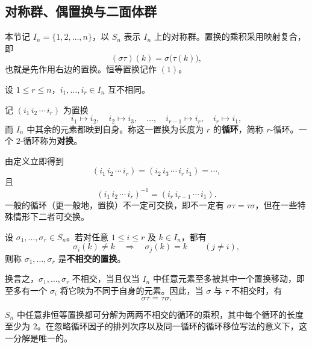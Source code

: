 \subsection{对称群、偶置换与二面体群}

本节记 $I_n=\{1,2,\ldots,n\}$，以 $S_n$ 表示 $I_n$ 上的对称群。置换的乘积采用映射复合，即
\[
  (\sigma\tau)(k)=\sigma\bigl(\tau(k)\bigr),
\]
也就是先作用右边的置换。恒等置换记作 $(1)$。

\begin{definition}[循环与对换]\label{def:cycles-transpositions}
设 $1\leq r\leq n$，$i_1,\ldots,i_r\in I_n$ 互不相同。

记 $(i_1\,i_2\,\cdots\,i_r)$ 为置换
\[
  i_1\longmapsto i_2,\quad i_2\longmapsto i_3,\quad\ldots,\quad
  i_{r-1}\longmapsto i_r,\quad i_r\longmapsto i_1,
\]
而 $I_n$ 中其余的元素都映到自身。称这一置换为长度为 $r$ 的\textbf{循环}，简称 $r$-循环。一个 $2$-循环称为\textbf{对换}。
\end{definition}

\begin{purplenote}
由定义立即得到
\[
  (i_1\,i_2\,\cdots\,i_r)
  =(i_2\,i_3\,\cdots\,i_r\,i_1)=\cdots,
\]
且
\[
  (i_1\,i_2\,\cdots\,i_r)^{-1}=(i_r\,i_{r-1}\,\cdots\,i_1).
\]
一般的循环（更一般地，置换）不一定可交换，即不一定有 $\sigma\tau=\tau\sigma$，但在一些特殊情形下二者可交换。
\end{purplenote}

\begin{definition}[不相交的置换]\label{def:disjoint-permutations}
设 $\sigma_1,\ldots,\sigma_r\in S_n$。若对任意 $1\leq i\leq r$ 及 $k\in I_n$，都有
\[
  \sigma_i(k)\neq k\quad\Longrightarrow\quad
  \sigma_j(k)=k\qquad(j\neq i),
\]
则称 $\sigma_1,\ldots,\sigma_r$ 是\textbf{不相交的置换}。
\end{definition}

\begin{purplenote}
换言之，$\sigma_1,\ldots,\sigma_r$ 不相交，当且仅当 $I_n$ 中任意元素至多被其中一个置换移动，即至多有一个 $\sigma_i$ 将它映为不同于自身的元素。因此，当 $\sigma$ 与 $\tau$ 不相交时，有
\[
  \sigma\tau=\tau\sigma.
\]
\end{purplenote}

\begin{theorem}\label{thm:disjoint-cycle-decomposition}
$S_n$ 中任意非恒等置换都可分解为两两不相交的循环的乘积，其中每个循环的长度至少为 $2$。在忽略循环因子的排列次序以及同一循环的循环移位写法的意义下，这一分解是唯一的。
\end{theorem}

